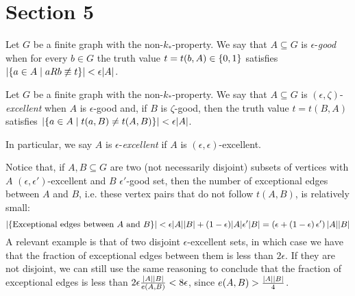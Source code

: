 \section{Section 5} \label{sec:section_5}

    \begin{definition}[Definition 5.2(a)]
        Let $G$ be a finite graph with the non-$k_*$-property.
        We say that $A \subseteq G$ is $\epsilon$-\emph{good} when for every $b \in G$ the truth value
        $t = t(b, A) \in \left\{ 0, 1 \right\}$ satisfies $\left| \left\{ a\in A \mid aRb \not\equiv t \right\} \right| < \epsilon |A|$.
    \end{definition}

    \begin{definition}[Definition 5.2(b)]
        Let $G$ be a finite graph with the non-$k_*$-property.
        We say that $A \subseteq G$ is $(\epsilon, \zeta)$-\emph{excellent} when $A$ is $\epsilon$-good and, if $B$ is
        $\zeta$-good, then the truth value $t = t(B,A)$ satisfies $\left| \left\{ a \in A \mid t(a,B) \neq t(A,B) \right\} \right| < \epsilon |A|$.

        In particular, we say $A$ is $\epsilon$-\emph{excellent} if $A$ is $(\epsilon, \epsilon)$-excellent.
    \end{definition}

    \begin{remark} \label{rmk:excellence_imply_little_exceptions}
        Notice that, if $A, B \subseteq G$ are two (not necessarily disjoint) subsets of vertices
        with $A$ $(\epsilon, \epsilon')$-excellent and $B$ $\epsilon'$-good set, then the number of exceptional edges between $A$ and $B$,
        i.e. these vertex pairs that do not follow $t(A,B)$, is relatively small:
        \[
            \left| \left\{ \text{Exceptional edges between } A \text{ and } B \right\} \right| <
                \epsilon |A| |B| + (1- \epsilon) |A| \epsilon' |B| = \left( \epsilon + \left( 1-\epsilon \right) \epsilon' \right) |A| |B|
        \]
        A relevant example is that of two disjoint $\epsilon$-excellent sets, in which case we have that the fraction
        of exceptional edges between them is less than $2\epsilon$.
        If they are not disjoint, we can still use the same reasoning to conclude that the fraction of exceptional edges
        is less than $2 \epsilon \frac{\left| A \right| \left| B \right|}{e(A,B)} < 8 \epsilon$, since
        $e(A,B) > \frac{\left| A \right| \left| B \right|}{4}$.
    \end{remark}

